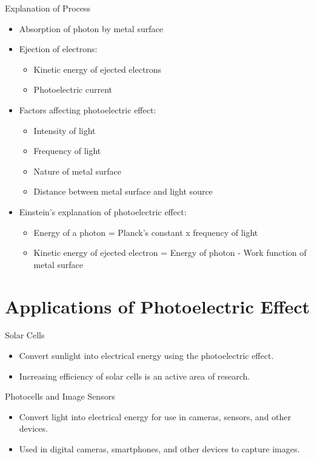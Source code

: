 \documentclass{beamer}
\begin{document}
\begin{frame}{Explanation of Process}
  \begin{itemize}
    \item Absorption of photon by metal surface
    \item Ejection of electrons:
      \begin{itemize}
        \item Kinetic energy of ejected electrons
        \item Photoelectric current
      \end{itemize}
    \item Factors affecting photoelectric effect:
      \begin{itemize}
        \item Intensity of light
        \item Frequency of light
        \item Nature of metal surface
        \item Distance between metal surface and light source
      \end{itemize}
    \item Einstein's explanation of photoelectric effect:
      \begin{itemize}
        \item Energy of a photon = Planck's constant x frequency of light
        \item Kinetic energy of ejected electron = Energy of photon - Work function of metal surface
      \end{itemize}
  \end{itemize}
\end{frame}

\section{Applications of Photoelectric Effect}
\begin{frame}{Solar Cells}
  \begin{itemize}
    \item Convert sunlight into electrical energy using the photoelectric effect.
    \item Increasing efficiency of solar cells is an active area of research.
  \end{itemize}
\end{frame}

\begin{frame}{Photocells and Image Sensors}
  \begin{itemize}
    \item Convert light into electrical energy for use in cameras, sensors, and other devices.
    \item Used in digital cameras, smartphones, and other devices to capture images.
  \end{itemize}
\end{frame}
\end{document}
